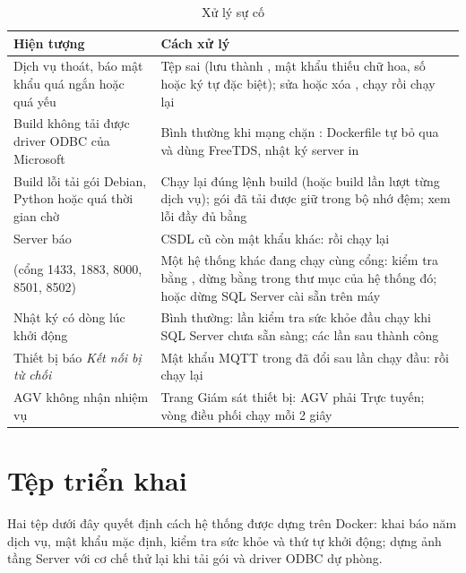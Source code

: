 \begin{table}[H]
\centering
\caption{Xử lý sự cố}
\label{tab:suco}
\small
\begin{tabularx}{\textwidth}{L{5.2cm} Y}
\toprule
\textbf{Hiện tượng} & \textbf{Cách xử lý} \\
\midrule
Dịch vụ  thoát, báo mật khẩu quá ngắn hoặc quá yếu & Tệp  sai (lưu thành , mật khẩu thiếu chữ hoa, số hoặc ký tự đặc biệt); sửa hoặc xóa , chạy  rồi chạy lại \\
Build  không tải được driver ODBC của Microsoft & Bình thường khi mạng chặn : Dockerfile tự bỏ qua và dùng FreeTDS, nhật ký server in  \\
Build lỗi tải gói Debian, Python hoặc quá thời gian chờ & Chạy lại đúng lệnh build (hoặc build lần lượt từng dịch vụ); gói đã tải được giữ trong bộ nhớ đệm; xem lỗi đầy đủ bằng  \\
Server báo  & CSDL cũ còn mật khẩu khác:  rồi chạy lại \\
 (cổng 1433, 1883, 8000, 8501, 8502) & Một hệ thống khác đang chạy cùng cổng: kiểm tra bằng , dừng bằng  trong thư mục của hệ thống đó; hoặc dừng SQL Server cài sẵn trên máy \\
Nhật ký  có dòng  lúc khởi động & Bình thường: lần kiểm tra sức khỏe đầu chạy khi SQL Server chưa sẵn sàng; các lần sau thành công \\
Thiết bị báo \emph{Kết nối bị từ chối} & Mật khẩu MQTT trong  đã đổi sau lần chạy đầu:  rồi chạy lại \\
AGV không nhận nhiệm vụ & Trang Giám sát thiết bị: AGV phải Trực tuyến; vòng điều phối chạy mỗi 2 giây \\
\bottomrule
\end{tabularx}
\end{table}

\section{Tệp triển khai}
Hai tệp dưới đây quyết định cách hệ thống được dựng trên Docker:  khai báo năm dịch vụ, mật khẩu mặc định, kiểm tra sức khỏe và thứ tự khởi động;  dựng ảnh tầng Server với cơ chế thử lại khi tải gói và driver ODBC dự phòng.

{\footnotesize


}
